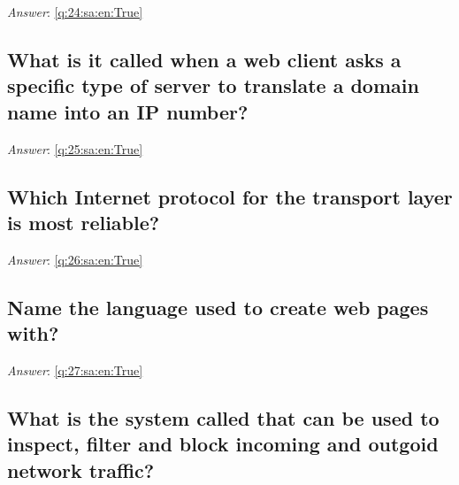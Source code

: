 \documentclass[a4paper,11pt,oneside]{article}
\begin{document}
\begin{sloppypar}
\textit{Answer}: \autoref{q:24:sa:en:True}



\subsection{What is it called when a web client asks a specific type of server to translate a domain name into an IP number?}

\label{q:25:sa:en:False}

\vspace{2cm}

\noindent\makebox[\textwidth]{\hrulefill}

\vspace{1cm}

\textit{Answer}: \autoref{q:25:sa:en:True}



\subsection{Which Internet protocol for the transport layer is most reliable?}

\label{q:26:sa:en:False}

\vspace{2cm}

\noindent\makebox[\textwidth]{\hrulefill}

\vspace{1cm}

\textit{Answer}: \autoref{q:26:sa:en:True}



\subsection{Name the language used to create web pages with?}

\label{q:27:sa:en:False}

\vspace{2cm}

\noindent\makebox[\textwidth]{\hrulefill}

\vspace{1cm}

\textit{Answer}: \autoref{q:27:sa:en:True}



\subsection{What is the system called that can be used to inspect, filter and block incoming and outgoid network traffic?}


\end{sloppypar}
\end{document}
